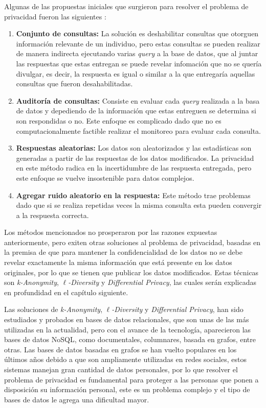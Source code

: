 Algunas de las propuestas iniciales que surgieron para resolver el problema de privacidad fueron las siguientes \cite{dwork2011firm}:
\begin{enumerate}
  \item \textbf{Conjunto de consultas:} La solución es deshabilitar consultas que otorguen información relevante de un individuo, pero estas consultas se pueden realizar de manera indirecta ejecutando varias \textit{query} a la base de datos, que al juntar las respuestas que estas entregan se puede revelar infomación que no se quería divulgar, es decir, la respuesta es igual o similar a la que entregaría aquellas consultas que fueron desahabilitadas.
  \item \textbf{Auditoría de consultas:} Consiste en evaluar cada \textit{query} realizada a la basa de datos y depediendo de la información que estas entreguen se determina si son respondidas o no. Este enfoque es complicado dado que no es computacionalmente factible realizar el monitoreo para evaluar cada consulta.
  \item \textbf{Respuestas aleatorias:} Los datos son aleatorizados y las estadísticas son generadas a partir de las respuestas de los datos modificados. La privacidad en este método radica en la incertidumbre de las respuesta entregada, pero este enfoque se vuelve insostenible para datos complejos.
  \item \textbf{Agregar ruido aleatorio en la respuesta:} Este método trae problemas dado que si se realiza repetidas veces la misma consulta esta pueden convergir a la respuesta correcta.
\end{enumerate}

Los métodos mencionados no prosperaron por las razones expuestas anteriormente, pero exiten otras soluciones al problema de privacidad, basadas en la premisa de que para mantener la confidencialidad de los datos no se debe revelar exactamente la misma información que está presente en los datos originales, por lo que se tienen que publicar los datos modificados. Estas técnicas son \textit{k-Anonymity}, \textit{$\ell$-Diversity} y \textit{Differential Privacy}, las cuales serán explicadas en profundidad en el capítulo siguiente.

Las soluciones de \textit{k-Anonymity}, \textit{$\ell$-Diversity} y \textit{Differential Privacy}, han sido estudiados y probados en bases de datos relacionales, que son unas de las más utilizadas en la actualidad, pero con el avance de la tecnología, aparecieron las bases de datos NoSQL, como documentales, columnares, basada en grafos, entre otras.
Las bases de datos basadas en grafos se han vuelto populares en los últimos años debido a que son ampliamente utilizadas en redes sociales, estos sistemas manejan gran cantidad de datos personales, por lo que resolver el problema de privacidad es fundamental para proteger a las personas que ponen a disposición su información personal, este es un problema complejo y el tipo de bases de datos le agrega una dificultad mayor.

